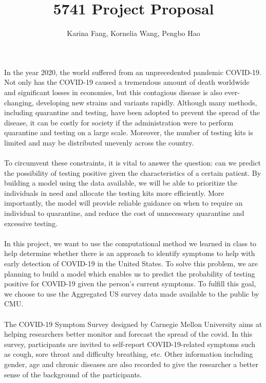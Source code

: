\documentclass{article}
\title{5741 Project Proposal}
\author{Karina Fang, Kornelia Wang, Pengbo Hao}
\begin{document}
\maketitle

In the year 2020, the world suffered from an unprecedented pandemic COVID-19. Not only has the COVID-19 caused a tremendous amount of death worldwide and significant losses in economies, but this contagious disease is also ever-changing, developing new strains and variants rapidly. Although many methods, including quarantine and testing, have been adopted to prevent the spread of the disease, it can be costly for society if the administration were to perform quarantine and testing on a large scale. Moreover, the number of testing kits is limited and may be distributed unevenly across the country. \\
~\\

To circumvent these constraints, it is vital to answer the question: can we predict the possibility of testing positive given the characteristics of a certain patient. By building a model using the data available, we will be able to prioritize the individuals in need and allocate the testing kits more efficiently. More importantly, the model will provide reliable guidance on when to require an individual to quarantine, and reduce the cost of unnecessary quarantine and excessive testing. \\
~\\

In this project, we want to use the computational method we learned in class to help determine whether there is an approach to identify symptoms to help with early detection of COVID-19 in the United States. To solve this problem, we are planning to build a model which enables us to predict the probability of testing positive for COVID-19 given the person’s current symptoms. To fulfill this goal, we choose to use the Aggregated US survey data made available to the public by CMU.\\
~\\

The COVID-19 Symptom Survey designed by Carnegie Mellon University aims at helping researchers better monitor and forecast the spread of the covid. In this survey, participants are invited to self-report COVID-19-related symptoms such as cough, sore throat and difficulty breathing, etc. Other information including gender, age and chronic diseases are also recorded to give the researcher a better sense of the background of the participants.\\
~\\
 
\end{document}
